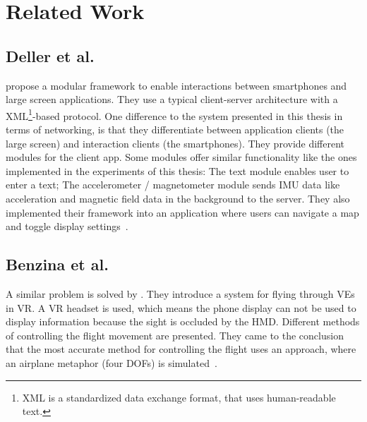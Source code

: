 \chapter{Related Work}\label{chapter:related-work}


\section{Deller et al.}\label{section:deller-2011}
\citeauthor{Deller.2011} propose a modular framework to enable interactions between smartphones and large screen applications. They use a typical client-server architecture with a XML\footnote{XML is a standardized data exchange format, that uses human-readable text.}-based protocol. One difference to the system presented in this thesis in terms of networking, is that they differentiate between application clients (the large screen) and interaction clients (the smartphones). They provide different modules for the client app. Some modules offer similar functionality like the ones implemented in the experiments of this thesis: The text module enables user to enter a text; The accelerometer / magnetometer module sends \ac{IMU} data like acceleration and magnetic field data in the background to the server. They also implemented their framework into an application where users can navigate a map and toggle display settings~\cite{Deller.2011}.


\section{Benzina et al.}\label{section:benzina-2011}
A similar problem is solved by \citeauthor{Benzina.2011}. They introduce a system for flying through \acp{VE} in \ac{VR}. A \ac{VR} headset is used, which means the phone display can not be used to display information because the sight is occluded by the \ac{HMD}. Different methods of controlling the flight movement are presented. They came to the conclusion that the most accurate method for controlling the flight uses an approach, where an airplane metaphor (four \acp{DOF}) is simulated~\cite{Benzina.2011}.


